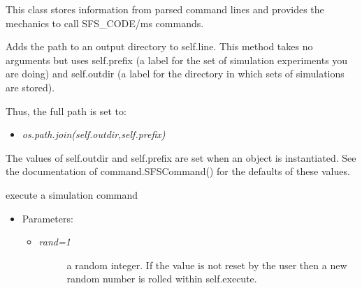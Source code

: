 \documentclass[letterpaper,10pt,english]{sphinxmanual}
\begin{document}
\begin{fulllineitems}
\label{index:command.Command}
This class stores information from parsed command lines
and provides the mechanics to call SFS\_CODE/ms commands.

\begin{fulllineitems}
\label{index:command.Command.add_out}
Adds the path to an output directory to self.line.  This method takes
no arguments but uses self.prefix (a label for the set of simulation
experiments you are doing) and self.outdir (a label for the directory
in which sets of simulations are stored).

Thus, the full path is set to:
\begin{itemize}
\item {} 
\emph{os.path.join(self.outdir,self.prefix)}

\end{itemize}

The values of self.outdir and self.prefix are set when an object is
instantiated.  See the documentation of command.SFSCommand() for the 
defaults of these values.

\end{fulllineitems}


\begin{fulllineitems}
\label{index:command.Command.execute}
execute a simulation command
\begin{itemize}
\item {} 
Parameters:
\begin{itemize}
\item {} \begin{description}
\item[{\emph{rand=1} }] \leavevmode
a random integer. If the value is not reset by the user
then a new random number is rolled within self.execute.

\end{description}

\end{itemize}

\end{itemize}

\end{fulllineitems}


\end{fulllineitems}
\end{document}

